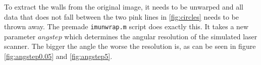 \documentclass[a4paper, 20pt]{article}
\begin{document}
\begin{figure}[!ht]
\centering
\begin{floatrow}
  
\end{floatrow}
\end{figure}


To extract the walls from the original image, it needs to be unwarped and all
data that does not fall between the two pink lines in \ref{fig:circles} needs to
be thrown away. The premade \texttt{imunwrap.m} script does exactly this. It
takes a new parameter $angstep$ which determines the angular resolution of the
simulated laser scanner. The bigger the angle the worse the resolution is, as
can be seen in figure \ref{fig:angstep0.05} and \ref{fig:angstep5}.
\end{document}
